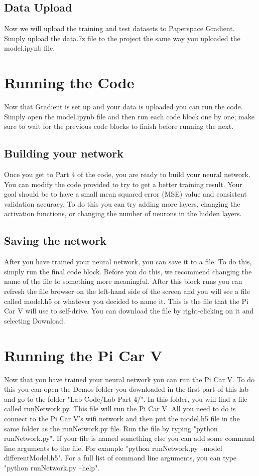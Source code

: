 \documentclass[11pt]{report}
\begin{document}
\section{Data Upload}
Now we will upload the training and test datasets to Paperspace Gradient. Simply upload the data.7z file to the project the same way you uploaded the model.ipynb file.

\chapter{Running the Code}
Now that Gradient is set up and your data is uploaded you can run the code. Simply open the model.ipynb file and then run each code block one by one; make sure to wait for the previous code blocks to finish before running the next.

\section{Building your network}
Once you get to Part 4 of the code, you are ready to build your neural network. You can modify the code provided to try to get a better training result. Your goal should be to have a small mean squared error (MSE) value and consistent validation accuracy. To do this you can try adding more layers, changing the activation functions, or changing the number of neurons in the hidden layers.

\section{Saving the network}
After you have trained your neural network, you can save it to a file. To do this, simply run the final code block. Before you do this, we recommend changing the name of the file to something more meaningful. After this block runs you can refresh the file browser on the left-hand side of the screen and you will see a file called model.h5 or whatever you decided to name it. This is the file that the Pi Car V will use to self-drive. You can download the file by right-clicking on it and selecting Download. 

\pagebreak

\chapter{Running the Pi Car V}
Now that you have trained your neural network you can run the Pi Car V. To do this you can open the Demos folder you downloaded in the first part of this lab and go to the folder "Lab Code/Lab Part 4/". In this folder, you will find a file called runNetwork.py. This file will run the Pi Car V. All you need to do is connect to the Pi Car V's wifi network and then put the model.h5 file in the same folder as the runNetwork.py file. Run the file by typing "python runNetwork.py". If your file is named something else you can add some command line arguments to the file. For example "python runNetwork.py --model differentModel.h5". For a full list of command line arguments, you can type "python runNetwork.py --help".
\end{document}
